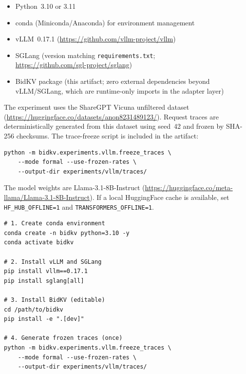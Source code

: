 \documentclass[conference]{IEEEtran}
\begin{document}

\begin{itemize}
  \item Python~3.10 or 3.11
  \item conda (Miniconda/Anaconda) for environment management
  \item vLLM~0.17.1 (\url{https://github.com/vllm-project/vllm})
  \item SGLang (version matching \texttt{requirements.txt};\\
    \url{https://github.com/sgl-project/sglang})
  \item BidKV package (this artifact; zero external dependencies beyond
    vLLM/SGLang, which are runtime-only imports in the adapter layer)
\end{itemize}


The experiment uses the ShareGPT Vicuna unfiltered dataset
(\url{https://huggingface.co/datasets/anon8231489123/}).
Request traces are deterministically generated from this dataset using
seed~42 and frozen by SHA-256 checksums.
The trace-freeze script is included in the artifact:

\begingroup\footnotesize\begin{verbatim}
python -m bidkv.experiments.vllm.freeze_traces \
    --mode formal --use-frozen-rates \
    --output-dir experiments/vllm/traces/
\end{verbatim}
\endgroup

The model weights are Llama-3.1-8B-Instruct
(\url{https://huggingface.co/meta-llama/Llama-3.1-8B-Instruct}).
If a local HuggingFace cache is available, set
\texttt{HF\_HUB\_OFFLINE=1} and \texttt{TRANSFORMERS\_OFFLINE=1}.

\artinpart{Installation and Deployment}

\begingroup\footnotesize\begin{verbatim}
# 1. Create conda environment
conda create -n bidkv python=3.10 -y
conda activate bidkv

# 2. Install vLLM and SGLang
pip install vllm==0.17.1
pip install sglang[all]

# 3. Install BidKV (editable)
cd /path/to/bidkv
pip install -e ".[dev]"

# 4. Generate frozen traces (once)
python -m bidkv.experiments.vllm.freeze_traces \
    --mode formal --use-frozen-rates \
    --output-dir experiments/vllm/traces/
\end{verbatim}
\endgroup
\end{document}
